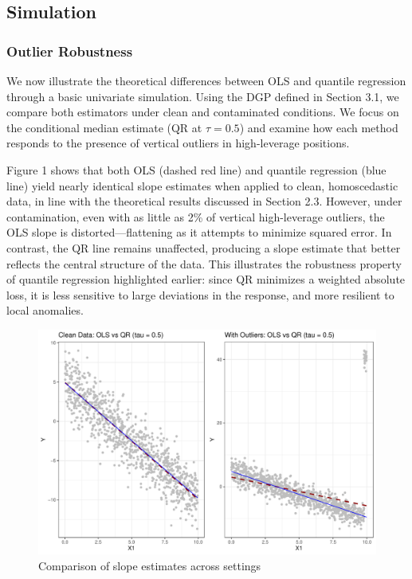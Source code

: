 \documentclass[fleqn,10pt]{latex/stylish_article} %
\begin{document}
\subsection{Simulation}\label{simulation}

\subsubsection{Outlier Robustness}\label{outlier-robustness}

We now illustrate the theoretical differences between OLS and quantile regression through a basic univariate simulation. Using the DGP defined in Section 3.1, we compare both estimators under clean and contaminated conditions. We focus on the conditional median estimate (QR at \(\tau = 0.5\)) and examine how each method responds to the presence of vertical outliers in high-leverage positions.

Figure 1 shows that both OLS (dashed red line) and quantile regression (blue line) yield nearly identical slope estimates when applied to clean, homoscedastic data, in line with the theoretical results discussed in Section 2.3. However, under contamination, even with as little as 2\% of vertical high-leverage outliers, the OLS slope is distorted---flattening as it attempts to minimize squared error. In contrast, the QR line remains unaffected, producing a slope estimate that better reflects the central structure of the data. This illustrates the robustness property of quantile regression highlighted earlier: since QR minimizes a weighted absolute loss, it is less sensitive to large deviations in the response, and more resilient to local anomalies.

\begin{figure}

{\centering \includegraphics[width=0.8\linewidth]{ADR_project_draft_files/figure-latex/unnamed-chunk-2-1} 

}

\caption{Comparison of slope estimates across settings}\label{fig:unnamed-chunk-2}
\end{figure}
\end{document}

